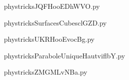     

    \clearpage
    


    \newcommand{\CaptionFigJQFHooEDhWVO}{<+Type your caption here+>}
    \begin{center}
        
    \end{center}
    phystricksJQFHooEDhWVO.py

    

    \clearpage
    


    \newcommand{\CaptionFigSurfacesCubesclGZD}{<+Type your caption here+>}
    \begin{center}
        
    \end{center}
    phystricksSurfacesCubesclGZD.py

    

    \clearpage
    


    \newcommand{\CaptionFigUKRHooEvocBg}{<+Type your caption here+>}
    \begin{center}
        
    \end{center}
    phystricksUKRHooEvocBg.py

    

    \clearpage
    


    \newcommand{\CaptionFigParaboleUniqueHautviflbY}{<+Type your caption here+>}
    \begin{center}
        
    \end{center}
    phystricksParaboleUniqueHautviflbY.py

    

    \clearpage
    


    \newcommand{\CaptionFigZMGMLvNBa}{<+Type your caption here+>}
    \begin{center}
        
    \end{center}
    phystricksZMGMLvNBa.py

    

    \clearpage
    

